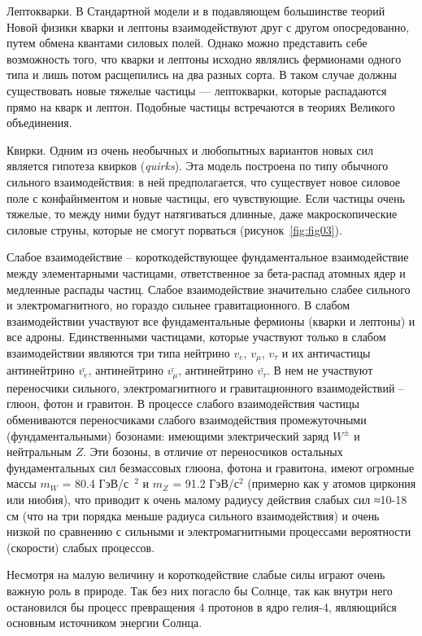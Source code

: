 Лептокварки. В Стандартной модели и в подавляющем большинстве теорий Новой физики кварки и лептоны взаимодействуют друг с другом опосредованно, путем обмена квантами силовых полей. Однако можно представить себе возможность того, что кварки и лептоны исходно являлись фермионами одного типа и лишь потом расщепились на два разных сорта. В таком случае должны существовать новые тяжелые частицы — лептокварки, которые распадаются прямо на кварк и лептон. Подобные частицы встречаются в теориях Великого объединения.

Квирки. Одним из очень необычных и любопытных вариантов новых сил является гипотеза квирков (\textit{quirks}). Эта модель построена по типу обычного сильного взаимодействия: в ней предполагается, что существует новое силовое поле с конфайнментом и новые частицы, его чувствующие. Если частицы очень тяжелые, то между ними будут натягиваться длинные, даже макроскопические силовые струны, которые не смогут порваться (рисунок~\ref{fig:fig03}).

Слабое взаимодействие – короткодействующее фундаментальное взаимодействие между элементарными частицами, ответственное за бета-распад атомных ядер и медленные распады частиц. Слабое взаимодействие значительно слабее сильного и электромагнитного, но гораздо сильнее гравитационного. В слабом взаимодействии участвуют все фундаментальные фермионы (кварки и лептоны) и все адроны. Единственными частицами, которые участвуют только в слабом взаимодействии являются три типа нейтрино $v_e$, $v_\mu$, $v_\tau$ и их античастицы  антинейтрино $\bar{v_e}$,  антинейтрино $\bar{v_\mu}$,  антинейтрино $\bar{v_\tau}$. В нем не участвуют переносчики сильного, электромагнитного и гравитационного взаимодействий -- глюон, фотон и гравитон. В процессе слабого взаимодействия частицы обмениваются переносчиками слабого взаимодействия промежуточными (фундаментальными) бозонами: имеющими электрический заряд $W^±$ и нейтральным $Z$. Эти бозоны, в отличие от переносчиков остальных фундаментальных сил безмассовых глюона, фотона и гравитона, имеют огромные массы $m_W$ = 80.4 ГэВ/с~${}^2$ и $m_Z$ = 91.2 ГэВ/с${}^2$ (примерно как у атомов циркония или ниобия), что приводит к очень малому радиусу действия слабых сил ≈10-18 см (что на три порядка меньше радиуса сильного взаимодействия) и очень низкой по сравнению с сильными и электромагнитными процессами вероятности (скорости) слабых процессов.

Несмотря на малую величину и короткодействие слабые силы играют очень важную роль в природе. Так без них погасло бы Солнце, так как внутри него остановился бы процесс превращения 4 протонов в ядро гелия-4, являющийся основным источником энергии Солнца.

